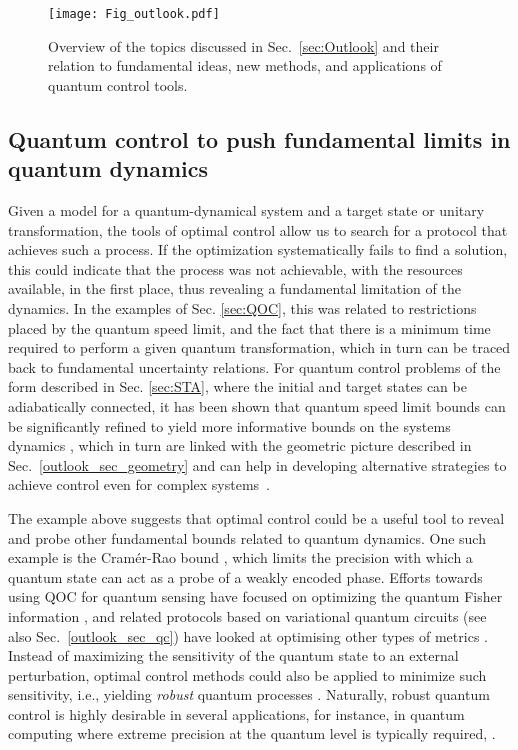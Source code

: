 \begin{figure}[h]
\label{fig:outlook}
\texttt{[image: Fig\_outlook.pdf]}
\caption{Overview of the topics discussed in Sec.~\ref{sec:Outlook} and their relation to fundamental ideas, new methods, and applications of quantum control tools.}
\end{figure}

\subsection{Quantum control to push fundamental limits in quantum dynamics}
Given a model for a quantum-dynamical system and a target state or unitary transformation, the tools of optimal control allow us to search for a protocol that achieves such a process. If the optimization systematically fails to find a solution, this could indicate that the process was not achievable, with the resources available, in the first place, thus revealing a fundamental limitation of the dynamics. In the examples of Sec. \ref{sec:QOC}, this was related to restrictions placed by the quantum speed limit, and the fact that there is a minimum time required to perform a given quantum transformation, which in turn can be traced back to fundamental uncertainty relations. For quantum control problems of the form described in Sec. \ref{sec:STA}, where the initial and target states can be adiabatically connected, it has been shown that quantum speed limit bounds can be significantly refined to yield more informative bounds on the systems dynamics \cite{mandelstam_45,fleming_73,bhattacharyya1983, anandan_90,margolus_98, bukov2019geometric,FunoPRL2017}, which in turn are linked with the geometric picture described in Sec.~\ref{outlook_sec_geometry} and can help in developing alternative strategies to achieve control even for complex systems~\cite{Balducci2}.

The example above suggests that optimal control could be a useful tool to reveal and probe other fundamental bounds related to quantum dynamics. One such example is the Cram\'er-Rao bound \cite{pezze2018}, which limits the precision with which a quantum state can act as a probe of a weakly encoded phase. Efforts towards using QOC for quantum sensing have focused on optimizing the quantum Fisher information \cite{pang2017,liu2017,lin2021,Gietka2021}, and related protocols based on variational quantum circuits (see also Sec.~\ref{outlook_sec_qc}) have looked at optimising other types of metrics \cite{kaubruegger2021}. Instead of maximizing the sensitivity of the quantum state to an external perturbation, optimal control methods could also be applied to minimize such sensitivity, i.e., yielding \textit{robust} quantum processes \cite{poggi2023_urc}. Naturally, robust quantum control is highly desirable in several applications, for instance, in quantum computing where extreme precision at the quantum level is typically required, .

